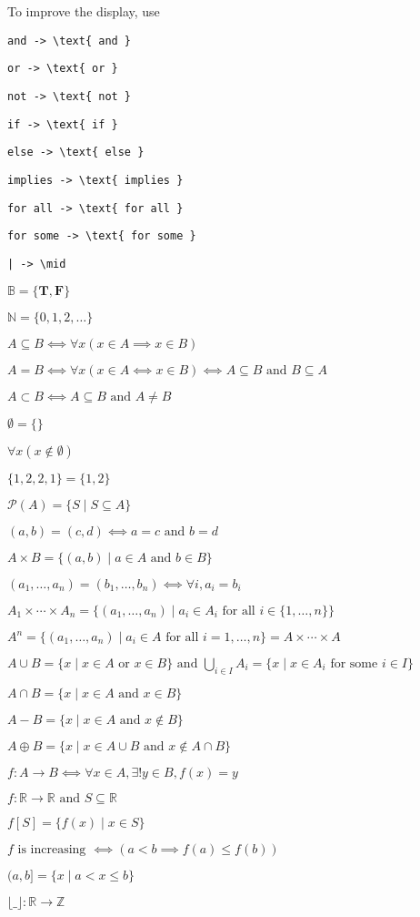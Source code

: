 \documentclass{article}
\begin{document}
To improve the display, use

\verb|and -> \text{ and }|

\verb|or -> \text{ or }|

\verb|not -> \text{ not }|

\verb|if -> \text{ if }|

\verb|else -> \text{ else }|

\verb|implies -> \text{ implies }|

\verb|for all -> \text{ for all }|

\verb|for some -> \text{ for some }|

\verb!| -> \mid!

$𝔹 = \{𝐓, 𝐅\}$

$ℕ = \{0,1,2,…\}$

$A ⊆ B ⟺ ∀x(x ∈ A ⟹ x ∈ B)$

$A = B ⟺ ∀x(x ∈ A ⟺ x ∈ B) ⟺ A ⊆ B \text{ and } B ⊆ A$

$A ⊂ B ⟺ A ⊆ B \text{ and } A ≠ B$

$∅ = \{\}$

$∀x(x ∉ ∅)$

$\{1,2,2,1\} = \{1,2\}$

$𝒫(A) = \{S ∣ S ⊆ A\}$

$(a,b) = (c,d) ⟺ a=c \text{ and } b=d$

$A × B = \{(a, b) ∣ a ∈ A \text{ and } b ∈ B\}$

$(a_1,…,a_n) = (b_1,…,b_n) ⟺ ∀i, a_i = b_i$

$A_1 × ⋯ × A_n = \{(a_1,…,a_n) ∣ a_i ∈ A_i \text{ for all } i ∈ \{1,…,n\}\}$

$A^n = \{(a_1,…,a_n) ∣ a_i ∈ A \text{ for all } i = 1,…,n\} = A × ⋯ × A$

$A ∪ B = \{x ∣ x ∈ A \text{ or } x ∈ B\} \text{ and } ⋃_{i∈I} A_i = \{x ∣ x ∈ A_i \text{ for some } i ∈ I\}$

$A ∩ B = \{x ∣ x ∈ A \text{ and } x ∈ B\}$

$A − B = \{x ∣ x ∈ A \text{ and } x ∉ B\}$

$A ⊕ B = \{x ∣ x ∈ A∪B \text{ and } x ∉ A∩B\}$

$f : A → B ⟺ ∀x∈A, ∃!y∈B, f(x)=y$

$f : ℝ → ℝ \text{ and } S ⊆ ℝ$

$f[S] = \{f(x) ∣ x ∈ S\}$

$f \text{ is increasing } ⟺ (a < b ⟹ f(a) ≤ f(b))$

$(a,b] = \{x ∣ a < x ≤ b\}$

$⌊\_⌋ : ℝ → ℤ$ 
\end{document}
